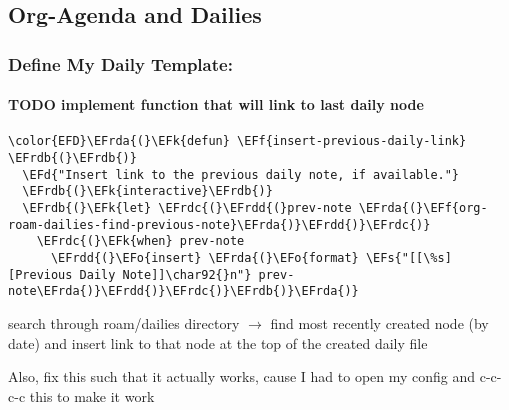 \documentclass{article}
\newcommand{\EFs}[1]{\textcolor{EFs}{#1}} %
\newcommand{\EFd}[1]{\textcolor{EFd}{#1}} %
\newcommand{\EFk}[1]{\textcolor{EFk}{#1}} %
\newcommand{\EFf}[1]{\textcolor{EFf}{#1}} %
\newcommand{\EFo}[1]{\textcolor{EFo}{#1}} %
\newcommand{\EFrda}[1]{\textcolor{EFrda}{#1}} %
\newcommand{\EFrdb}[1]{\textcolor{EFrdb}{#1}} %
\newcommand{\EFrdc}[1]{\textcolor{EFrdc}{#1}} %
\newcommand{\EFrdd}[1]{\textcolor{EFrdd}{#1}} %
\begin{document}
\subsection{Org-Agenda and Dailies}
\label{sec:orgdd69f16}
\subsubsection{Define My Daily Template:}
\label{sec:org831c6b1}
\paragraph{{\bfseries\sffamily TODO} implement function that will link to last daily node}
\label{sec:orgb3ebce8}
\begin{Code}
\begin{Verbatim}
\color{EFD}\EFrda{(}\EFk{defun} \EFf{insert-previous-daily-link} \EFrdb{(}\EFrdb{)}
  \EFd{"Insert link to the previous daily note, if available."}
  \EFrdb{(}\EFk{interactive}\EFrdb{)}
  \EFrdb{(}\EFk{let} \EFrdc{(}\EFrdd{(}prev-note \EFrda{(}\EFf{org-roam-dailies-find-previous-note}\EFrda{)}\EFrdd{)}\EFrdc{)}
    \EFrdc{(}\EFk{when} prev-note
      \EFrdd{(}\EFo{insert} \EFrda{(}\EFo{format} \EFs{"[[\%s][Previous Daily Note]]\char92{}n"} prev-note\EFrda{)}\EFrdd{)}\EFrdc{)}\EFrdb{)}\EFrda{)}
\end{Verbatim}
\end{Code}

search through roam/dailies directory \(\to\) find most recently created node (by date) and insert link to that node at the top of the created daily file

Also, fix this such that it actually works, cause I had to open my config and c-c-c-c this to make it work
\end{document}
